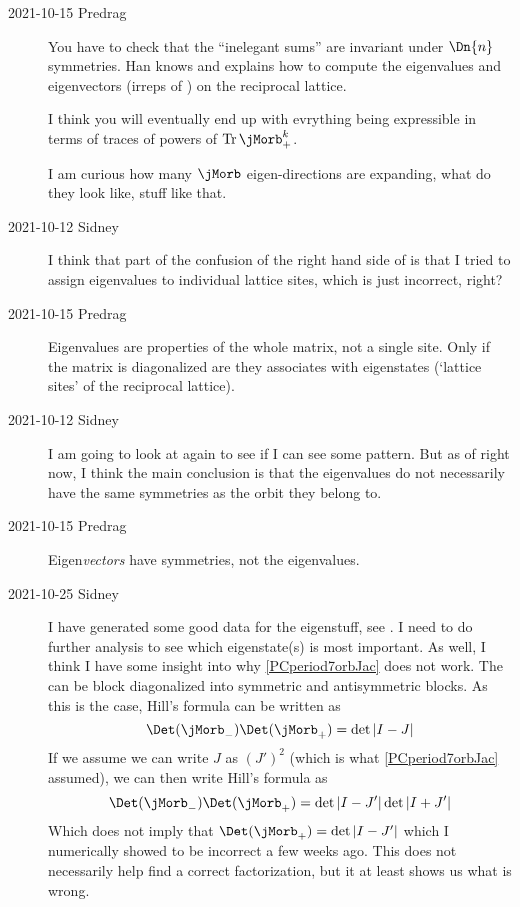 \begin{description}
\item[2021-10-15 Predrag]
You have to check that the ``inelegant sums'' are invariant under
$\Dn{n}$ symmetries. Han knows and explains how to compute the
eigenvalues and eigenvectors (irreps of ) on the reciprocal
lattice.

I think you will eventually end up with evrything being expressible in
terms of traces of powers of $\Tr \jMorb_+^k$.

I am curious how many {\jacobianOrb} $\jMorb$ eigen-directions are
expanding, what do they look like, stuff like that.

\item[2021-10-12 Sidney]
I think that part of the confusion of the right
hand side of  is that I tried to assign eigenvalues
to individual lattice sites, which is just incorrect, right?

\item[2021-10-15 Predrag]
Eigenvalues are properties of the whole matrix, not a single site.
Only if the matrix is diagonalized are they associates with eigenstates
(`lattice sites' of the reciprocal lattice).

\item[2021-10-12 Sidney]
I am going
to look at  again to see if I can see some pattern. But as
of right now, I think the main conclusion is that the eigenvalues do not
necessarily have the same symmetries as the orbit they belong to.

\item[2021-10-15 Predrag]
Eigen\emph{vectors} have symmetries, not the eigenvalues.

\item[2021-10-25 Sidney]
I have generated some good data for
the eigenstuff, see .
I need to do further analysis to see which eigenstate(s) is most
important. As well, I think I have some insight into why
\eqref{PCperiod7orbJac} does not work.
The {\jacobianOrb} can be block diagonalized into symmetric and
antisymmetric blocks. As this is the case, Hill's formula can be written
as
$$\Det(\jMorb_-)\Det(\jMorb_+)=\det|I-J|$$
If we assume we can write $J$ as $(J')^2$ (which is what
\eqref{PCperiod7orbJac} assumed), we can then write Hill's formula as
$$\Det(\jMorb_-)\Det(\jMorb_+)=\det|I-J'|\det|I+J'|$$
Which does not imply that $\Det(\jMorb_+)=\det|I-J'|$ which I numerically
showed to be incorrect a few weeks ago. This does not necessarily help
find a correct factorization, but it at least shows us what is wrong.


\end{description}
